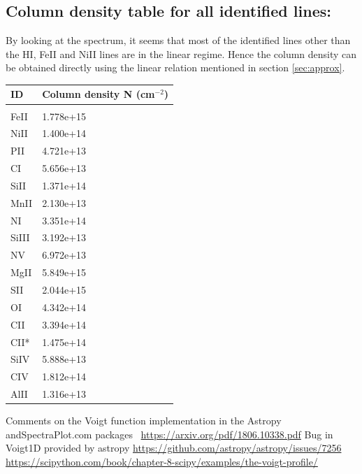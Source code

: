 \documentclass[12pt]{article}
\begin{document}
\subsection{Column density table for all identified lines:}
By looking at the spectrum, it seems that most of the identified lines other than the HI, FeII and NiII lines are in the linear regime. Hence the column density can be obtained directly using the linear relation mentioned in section \ref{sec:approx}.
\begin{table}[H]
\begin{tabular}{l|l}
ID & Column density N (cm$^{-2}$)\\
\hline & \\
FeII  & 1.778e+15 \\
NiII  & 1.400e+14 \\
PII   & 4.721e+13 \\
CI    & 5.656e+13 \\
SiII  & 1.371e+14 \\
MnII  & 2.130e+13 \\
NI    & 3.351e+14 \\
SiIII & 3.192e+13 \\
NV    & 6.972e+13 \\
MgII  & 5.849e+15 \\
SII   & 2.044e+15 \\
OI    & 4.342e+14 \\
CII   & 3.394e+14 \\
CII*  & 1.475e+14 \\
SiIV  & 5.888e+13 \\
CIV   & 1.812e+14 \\
AlII  & 1.316e+13
\end{tabular}
\end{table}


 


%
\begin{thebibliography}{8}
	Comments on the Voigt function implementation in the Astropy andSpectraPlot.com packages ~\url{https://arxiv.org/pdf/1806.10338.pdf}
	Bug in Voigt1D provided by astropy
	\url{https://github.com/astropy/astropy/issues/7256}
	\url{https://scipython.com/book/chapter-8-scipy/examples/the-voigt-profile/}
\end{thebibliography}
\end{document}
